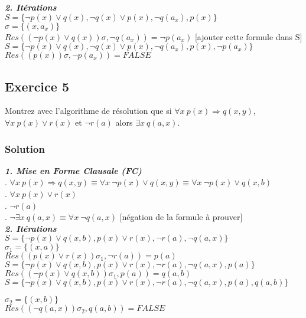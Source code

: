     \textbf{\textit{2. Itérations }} \\
    $ S = \{ \neg p(x) \lor q(x) , \neg q(x) \lor p(x) ,  \neg q(a_{x}) , p(x) \}  $ \\
    $ \sigma = \{(x, a_{x}) \} $ \\
    $ Res( (\neg p(x) \lor q(x))\sigma , \neg q(a_{x}) ) = \neg p(a_{x}) $ [ajouter cette formule dans S] \\
    $ S = \{ \neg p(x) \lor q(x) , \neg q(x) \lor p(x) ,  \neg q(a_{x}) , p(x), \neg p(a_{x}) \}$  \\
    $ Res( (p(x))\sigma, \neg p(a_{x}) ) = FALSE $ \\


\subsection*{Exercice 5}
Montrez avec l'algorithme de r\'{e}solution que si $\forall x \ p(x) \Rightarrow q(x, y)$, $\forall x \ p(x) \vee r(x)$ et $\neg r(a)$ alors $\exists x \ q(a, x)$.

    \subsubsection*{Solution}
    
     \textbf{\textit{ 1. Mise en Forme Clausale (FC)}} \\
     . $\forall x \ p(x) \Rightarrow q(x, y) \equiv \forall x \ \neg p(x) \lor q(x,y) \equiv \forall x \ \neg p(x) \lor q(x,b)  $ \\
     . $\forall x \ p(x) \lor r(x) $ \\
     . $\neg r(a) $ \\
     . $\neg \exists x \ q(a, x) \equiv \forall x \ \neg q(a,x) $ [négation de la formule à prouver] \\
    
    
    \textbf{\textit{2. Itérations }} \\
    $ S = \{ \neg p(x) \lor q(x,b), p(x) \lor r(x), \neg r(a), \neg q(a,x) \} $\\
    $ \sigma_{1} = \{ (x,a) \}$\\
    $ Res( (p(x) \lor r(x))\sigma_{1}, \neg r(a) ) = p(a) $\\
    $ S = \{ \neg p(x) \lor q(x,b), p(x) \lor r(x), \neg r(a), \neg q(a,x), p(a) \} $\\
    $ Res( (\neg p(x) \lor q(x,b))\sigma_{1}, p(a) )= q(a,b) $\\
    $ S = \{ \neg p(x) \lor q(x,b), p(x) \lor r(x), \neg r(a), \neg q(a,x), p(a), q(a,b) \} $
    
    \noindent $ \sigma_{2} = \{ (x,b) \}$\\
    $ Res( (\neg q(a,x))\sigma_{2}, q(a,b) )= FALSE $\\
    

